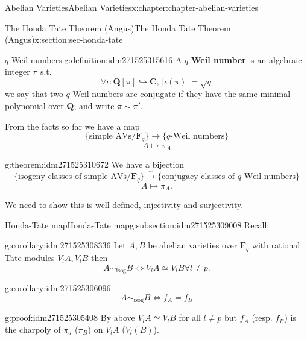 \documentclass[oneside,10pt,]{book}
\newcommand{\terminology}[1]{\textbf{#1}}
\numberwithin{equation}{section}
\newcommand{\lb}{[}
\newcommand{\rb}{]}
\newcommand{\QQ}{\mathbf{Q}}
\newcommand{\CC}{\mathbf{C}}
\newcommand{\FF}{\mathbf{F}}
\begin{document}
\begin{chapterptx}{Abelian Varieties}{}{Abelian Varieties}{}{}{x:chapter:chapter-abelian-varieties}
\begin{sectionptx}{The Honda Tate Theorem (Angus)}{}{The Honda Tate Theorem (Angus)}{}{}{x:section:sec-honda-tate}
\begin{introduction}{}
\begin{definition}{\(q\)-Weil numbers.}{g:definition:idm271525315616}
A \(q\)-\terminology{Weil number} is an algebraic integer \(\pi\) s.t.%
\begin{equation*}
\forall \iota \colon \QQ\lb \pi\rb \hookrightarrow \CC,\,|\iota(\pi)| = \sqrt q
\end{equation*}
we say that two \(q\)-Weil numbers are conjugate if they have the same minimal polynomial over \(\QQ\), and write \(\pi \sim \pi'\).%
\end{definition}
From the facts so far we have a map%
\begin{equation*}
\{\text{simple AVs}/\FF_q\}\to \{q\text{-Weil numbers}\}
\end{equation*}
%
\begin{equation*}
A \mapsto \pi_A
\end{equation*}
%
\begin{theorem}{}{}{g:theorem:idm271525310672}%
We have a bijection%
\begin{equation*}
\{\text{isogeny classes of simple AVs}/\FF_q\}\xrightarrow{\sim} \{\text{conjugacy classes of }q\text{-Weil numbers}\}
\end{equation*}
%
\begin{equation*}
A \mapsto \pi_A\text{.}
\end{equation*}
%
\end{theorem}
We need to show this is well-defined, injectivity and surjectivity.%
\end{introduction}%
%
%
\typeout{************************************************}
\typeout{************************************************}
%
\begin{subsectionptx}{Honda-Tate map}{}{Honda-Tate map}{}{}{g:subsection:idm271525309008}
Recall:%
\begin{corollary}{}{}{g:corollary:idm271525308336}%
Let \(A,B\) be abelian varieties over \(\FF_q\) with rational Tate modules \(V_l A, V_lB\) then%
\begin{equation*}
A\sim_{\text{isog}} B \iff V_l A \simeq V_l B \forall l \ne p\text{.}
\end{equation*}
%
\end{corollary}
\begin{corollary}{}{}{g:corollary:idm271525306096}%
%
\begin{equation*}
A\sim_{\text{isog}} B \iff f_A = f_B
\end{equation*}
%
\end{corollary}
\begin{proofptx}{}{g:proof:idm271525305408}
By above \(V_l A \simeq V_lB\) for all \(l \ne p\) but \(f_A\) (resp. \(f_B\)) is the charpoly of \(\pi_a\) (\(\pi_B\)) on \(V_l A\) (\(V_l(B)\)).%

\end{proofptx}
\end{subsectionptx}
\end{sectionptx}
\end{chapterptx}
\end{document}

